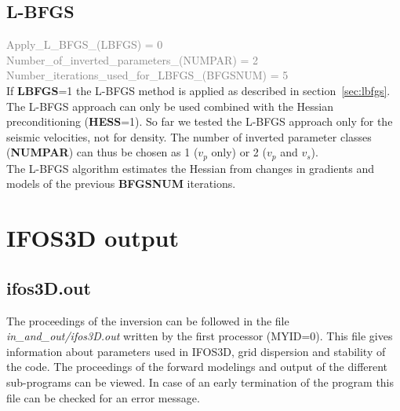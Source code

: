 \subsection{L-BFGS}
\textcolor {Gray}{Apply\_L\_BFGS\_(LBFGS) = 0\\
Number\_of\_inverted\_parameters\_(NUMPAR) = 2\\
Number\_iterations\_used\_for\_LBFGS\_(BFGSNUM) = 5} \vspace{0.1cm}\\
If \textbf{LBFGS}=1 the L-BFGS method is applied as described in section~\ref{sec:lbfgs}. The L-BFGS approach can only be used combined with the Hessian preconditioning (\textbf{HESS}=1). So far we tested the L-BFGS approach only for the seismic velocities, not for density. The number of inverted parameter classes (\textbf{NUMPAR}) can thus be chosen as 1 ($v_p$ only) or 2 ($v_p$ and $v_s$).\\
The L-BFGS algorithm estimates the Hessian from changes in gradients and models of the previous \textbf{BFGSNUM} iterations. 

\section{IFOS3D output}
\subsection{ifos3D.out}
The proceedings of the inversion can be followed in the file \textit{in\_and\_out/ifos3D.out} written by the first processor (MYID=0). This file gives information about parameters used in IFOS3D, grid dispersion and stability of the code. The proceedings of the forward modelings and output of the different sub-programs can be viewed. In case of an early termination of the program this file can be checked for an error message.
